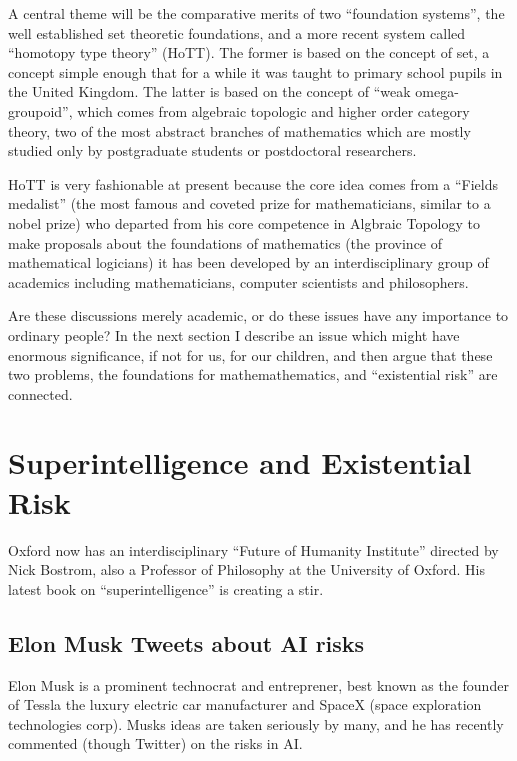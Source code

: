 \documentclass[12pt,titlepage]{article}
\begin{document}
A central theme will be the comparative merits of two ``foundation systems'', the well established set theoretic foundations, and a more recent system called ``homotopy type theory'' (HoTT).
The former is based on the concept of set, a concept simple enough that for a while it was taught to primary school pupils in the United Kingdom.
The latter is based on the concept of ``weak omega-groupoid'', which comes from algebraic topologic and higher order category theory, two of the most abstract branches of mathematics which are mostly studied only by postgraduate students or postdoctoral researchers.

HoTT is very fashionable at present because the core idea comes from a ``Fields medalist'' (the most famous and coveted prize for mathematicians, similar to a nobel prize) who departed from his core competence in Algbraic Topology to make proposals about the foundations of mathematics (the province of mathematical logicians) it has been developed by an interdisciplinary group of academics including mathematicians, computer scientists and philosophers.

Are these discussions merely academic, or do these issues have any importance to ordinary people?
In the next section I describe an issue which might have enormous significance, if not for us, for our children, and then argue that these two problems, the foundations for mathemathematics, and ``existential risk'' are connected.

\pagebreak
\section{Superintelligence and Existential Risk}

Oxford now has an interdisciplinary ``Future of Humanity Institute'' directed by Nick Bostrom, also a Professor of Philosophy at the University of Oxford.
His latest book on ``superintelligence'' is creating a stir.

\subsection{Elon Musk Tweets about AI risks} 

Elon Musk is a prominent technocrat and entreprener, best known as the founder of Tessla the luxury electric car manufacturer and SpaceX (space exploration technologies corp).
Musks ideas are taken seriously by many, and he has recently commented (though Twitter) on the risks in AI.
\end{document}
